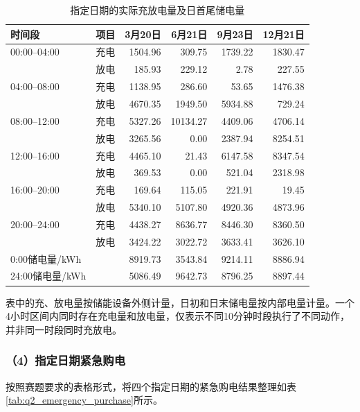 \begin{table}[H]
\centering
\caption{指定日期的实际充放电量及日首尾储电量}
\label{tab:q2_storage}
\begin{tabular}{llrrrr}
\hline
时间段 & 项目 & 3月20日 & 6月21日 & 9月23日 & 12月21日 \\
\hline
00:00--04:00 & 充电
& 1504.96 & 309.75 & 1739.22 & 1830.47 \\
& 放电
& 185.93 & 229.12 & 2.78 & 227.55 \\

04:00--08:00 & 充电
& 1138.95 & 286.60 & 53.65 & 1476.38 \\
& 放电
& 4670.35 & 1949.50 & 5934.88 & 729.24 \\

08:00--12:00 & 充电
& 5327.26 & 10134.27 & 4409.06 & 4706.14 \\
& 放电
& 3265.56 & 0.00 & 2387.94 & 8254.51 \\

12:00--16:00 & 充电
& 4465.10 & 21.43 & 6147.58 & 8347.54 \\
& 放电
& 369.53 & 0.00 & 521.04 & 2318.98 \\

16:00--20:00 & 充电
& 169.64 & 115.05 & 221.91 & 19.45 \\
& 放电
& 5340.10 & 5107.80 & 4920.36 & 4873.96 \\

20:00--24:00 & 充电
& 4438.27 & 8636.77 & 8446.30 & 8360.50 \\
& 放电
& 3424.22 & 3022.72 & 3633.41 & 3626.10 \\
\hline
0:00储电量/kWh & 
& 8919.73 & 3543.84 & 9214.11 & 8886.94 \\
24:00储电量/kWh &
& 5086.49 & 9642.73 & 8796.25 & 8897.44 \\
\hline
\end{tabular}
\end{table}

表中的充、放电量按储能设备外侧计量，日初和日末储电量按内部电量计量。一个4小时区间内同时存在充电量和放电量，仅表示不同10分钟时段执行了不同动作，并非同一时段同时充放电。


\subsubsection*{（4）指定日期紧急购电}

按照赛题要求的表格形式，将四个指定日期的紧急购电结果整理如表\ref{tab:q2_emergency_purchase}所示。

